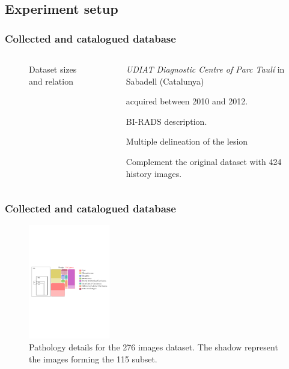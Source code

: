 \subsection{Experiment setup}
\begin{frame}\frametitle{Collected and catalogued  database}
\begin{columns}
\begin{column}{.4\textwidth}
\begin{figure}
\centering

\caption{Dataset sizes and relation}
\end{figure}
\end{column}
\begin{column}{.6\textwidth}
 \emph{UDIAT Diagnostic Centre of Parc Taul\'{i}} in Sabadell (Catalunya)
 \vspace{10pt}
 \begin{description}\small
 \item[276 images] acquired between 2010 and 2012.
 \item[150 images] BI-RADS description.
 \item[115 images] Multiple delineation of the lesion
 \item[700 images] Complement the original dataset with 424 history images.
 \end{description}
\end{column}
\end{columns}

		
\end{frame}

\begin{frame}\frametitle{Collected and catalogued  database}
\begin{figure}[Htbp]
\centering
\includegraphics[trim= 160 300 0 300, clip, height=5cm]{bbdd}
\caption{ Pathology details for the 276 images dataset. The shadow represent the images forming the 115 subset. }
\end{figure}
\end{frame}

